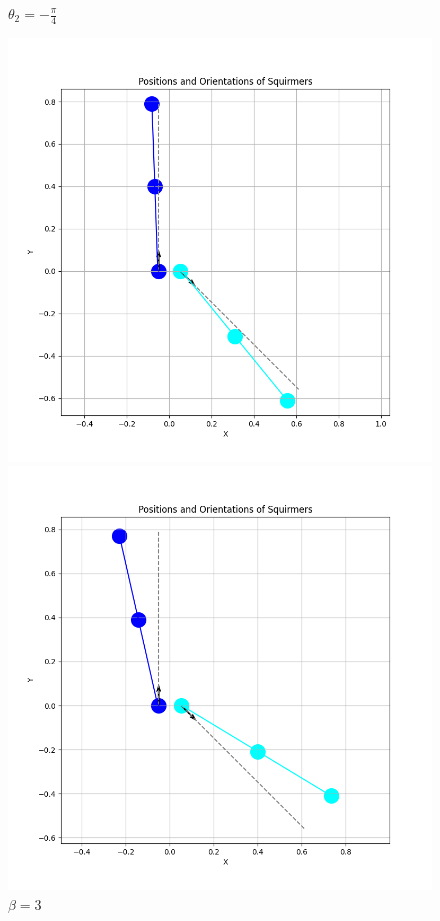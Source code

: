 \documentclass{article}
\begin{document}
\begin{figure}[H]
    \centering
    \textbf{$\theta_2 = -\frac{\pi}{4}$}\par\medskip
    \begin{minipage}{0.49\textwidth}
        \includegraphics[width=1.1\textwidth]{graphs/simulations/sim_sq_sq/betam3/mpi_4_.png}
        \caption{\footnotesize $\beta = -3$}
    \end{minipage}\hfill
    \begin{minipage}{0.49\textwidth}
        \includegraphics[width=1.1\textwidth]{graphs/simulations/sim_sq_sq/beta3/mpi_4_.png}
        \caption{\footnotesize $\beta = 3$}
    \end{minipage}
\end{figure}
\end{document}
